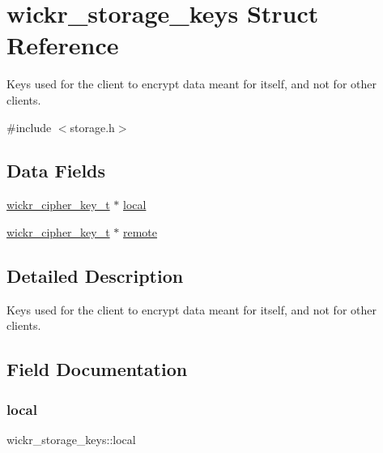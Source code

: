 \hypertarget{structwickr__storage__keys}{}\section{wickr\+\_\+storage\+\_\+keys Struct Reference}
\label{structwickr__storage__keys}


Key\textquotesingle{}s used for the client to encrypt data meant for itself, and not for other clients.  




{\ttfamily \#include $<$storage.\+h$>$}

\subsection*{Data Fields}
\begin{DoxyCompactItemize}
\item 
\hyperlink{structwickr__cipher__key}{wickr\+\_\+cipher\+\_\+key\+\_\+t} $\ast$ \hyperlink{structwickr__storage__keys_a544b35d7a75bd6076f6c34537e49ef6b}{local}
\item 
\hyperlink{structwickr__cipher__key}{wickr\+\_\+cipher\+\_\+key\+\_\+t} $\ast$ \hyperlink{structwickr__storage__keys_a44b6a0b14bcc877cb6799265b060cb28}{remote}
\end{DoxyCompactItemize}


\subsection{Detailed Description}
Key\textquotesingle{}s used for the client to encrypt data meant for itself, and not for other clients. 

\subsection{Field Documentation}
\mbox{\label{structwickr__storage__keys_a544b35d7a75bd6076f6c34537e49ef6b}} 
\subsubsection{\texorpdfstring{local}{local}}
{\footnotesize\ttfamily wickr\+\_\+storage\+\_\+keys\+::local}

